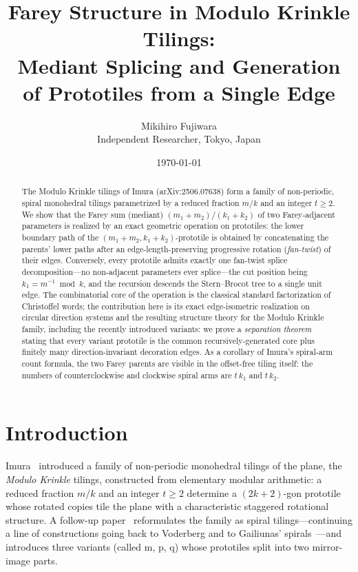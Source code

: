 \documentclass[11pt]{article}
\title{Farey Structure in Modulo Krinkle Tilings:\\
Mediant Splicing and Generation of Prototiles from a Single Edge}
\author{Mikihiro Fujiwara\\[2pt] \small Independent Researcher, Tokyo, Japan}
\date{\today}
\theoremstyle{remark}
\theoremstyle{definition}
\begin{document}
\maketitle

\begin{abstract}
The Modulo Krinkle tilings of Imura (arXiv:2506.07638) form a family of non-periodic,
spiral monohedral tilings parametrized by a reduced fraction $m/k$ and an integer $t\ge 2$.
We show that the Farey sum (mediant) $(m_1+m_2)/(k_1+k_2)$ of two Farey-adjacent parameters
is realized by an exact geometric operation on prototiles: the lower boundary path of the
$(m_1+m_2,k_1+k_2)$-prototile is obtained by concatenating the parents' lower paths after an
edge-length-preserving progressive rotation (\emph{fan-twist}) of their edges.
Conversely, every prototile admits exactly one fan-twist splice decomposition---no
non-adjacent parameters ever splice---the cut position being $k_1=m^{-1}\bmod k$,
and the recursion descends the Stern--Brocot tree to a single unit edge.
The combinatorial core of the operation is the classical standard factorization of Christoffel
words; the contribution here is its exact edge-isometric realization on circular direction systems
and the resulting structure theory for the Modulo Krinkle family, including the recently
introduced variants: we prove a \emph{separation theorem} stating that every variant prototile
is the common recursively-generated core plus finitely many direction-invariant decoration
edges. As a corollary of Imura's spiral-arm count formula, the two Farey parents are visible
in the offset-free tiling itself: the numbers of counterclockwise and clockwise spiral arms
are $t\,k_1$ and $t\,k_2$.
\end{abstract}

\section{Introduction}\label{sec:intro}

Imura~\cite{Imura2025} introduced a family of non-periodic monohedral tilings of the plane,
the \emph{Modulo Krinkle} tilings, constructed from elementary modular arithmetic:
a reduced fraction $m/k$ and an integer $t\ge 2$ determine a $(2k+2)$-gon prototile whose
rotated copies tile the plane with a characteristic staggered rotational structure.
A follow-up paper~\cite{Imura2026} reformulates the family as spiral tilings---continuing a
line of constructions going back to Voderberg and to Gailiunas'
spirals~\cite{Gailiunas2000,StockWichmann2000,GruenbaumShephard1987}---and introduces three
variants (called $\mathrm{m}$, $\mathrm{p}$, $\mathrm{q}$) whose prototiles split into two
mirror-image parts.
\end{document}
